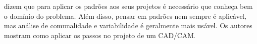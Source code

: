 \cite{DP:explained} dizem que para aplicar os padrões aos seus projetos é necessário que conheça bem o domínio do problema. Além disso, pensar em padrões nem sempre é aplicável, mas análise de comunalidade e variabilidade é geralmente mais usável. Os autores mostram como aplicar os passos no projeto de um CAD/CAM.
